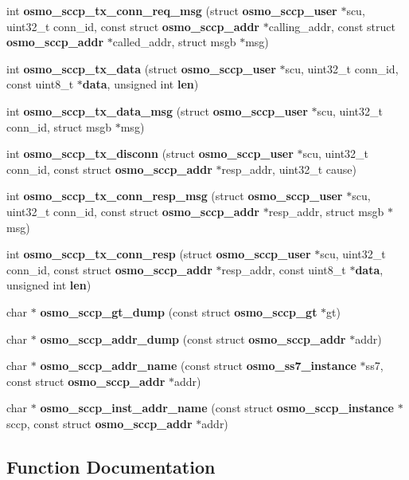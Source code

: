 \begin{DoxyCompactItemize}
int {\bf osmo\+\_\+sccp\+\_\+tx\+\_\+conn\+\_\+req\+\_\+msg} (struct {\bf osmo\+\_\+sccp\+\_\+user} $\ast$scu, uint32\+\_\+t conn\+\_\+id, const struct {\bf osmo\+\_\+sccp\+\_\+addr} $\ast$calling\+\_\+addr, const struct {\bf osmo\+\_\+sccp\+\_\+addr} $\ast$called\+\_\+addr, struct msgb $\ast$msg)
\item 
int {\bf osmo\+\_\+sccp\+\_\+tx\+\_\+data} (struct {\bf osmo\+\_\+sccp\+\_\+user} $\ast$scu, uint32\+\_\+t conn\+\_\+id, const uint8\+\_\+t $\ast${\bf data}, unsigned int {\bf len})
\item 
int {\bf osmo\+\_\+sccp\+\_\+tx\+\_\+data\+\_\+msg} (struct {\bf osmo\+\_\+sccp\+\_\+user} $\ast$scu, uint32\+\_\+t conn\+\_\+id, struct msgb $\ast$msg)
\item 
int {\bf osmo\+\_\+sccp\+\_\+tx\+\_\+disconn} (struct {\bf osmo\+\_\+sccp\+\_\+user} $\ast$scu, uint32\+\_\+t conn\+\_\+id, const struct {\bf osmo\+\_\+sccp\+\_\+addr} $\ast$resp\+\_\+addr, uint32\+\_\+t cause)
\item 
int {\bf osmo\+\_\+sccp\+\_\+tx\+\_\+conn\+\_\+resp\+\_\+msg} (struct {\bf osmo\+\_\+sccp\+\_\+user} $\ast$scu, uint32\+\_\+t conn\+\_\+id, const struct {\bf osmo\+\_\+sccp\+\_\+addr} $\ast$resp\+\_\+addr, struct msgb $\ast$msg)
\item 
int {\bf osmo\+\_\+sccp\+\_\+tx\+\_\+conn\+\_\+resp} (struct {\bf osmo\+\_\+sccp\+\_\+user} $\ast$scu, uint32\+\_\+t conn\+\_\+id, const struct {\bf osmo\+\_\+sccp\+\_\+addr} $\ast$resp\+\_\+addr, const uint8\+\_\+t $\ast${\bf data}, unsigned int {\bf len})
\item 
char $\ast$ {\bf osmo\+\_\+sccp\+\_\+gt\+\_\+dump} (const struct {\bf osmo\+\_\+sccp\+\_\+gt} $\ast$gt)
\item 
char $\ast$ {\bf osmo\+\_\+sccp\+\_\+addr\+\_\+dump} (const struct {\bf osmo\+\_\+sccp\+\_\+addr} $\ast$addr)
\item 
char $\ast$ {\bf osmo\+\_\+sccp\+\_\+addr\+\_\+name} (const struct {\bf osmo\+\_\+ss7\+\_\+instance} $\ast$ss7, const struct {\bf osmo\+\_\+sccp\+\_\+addr} $\ast$addr)
\item 
char $\ast$ {\bf osmo\+\_\+sccp\+\_\+inst\+\_\+addr\+\_\+name} (const struct {\bf osmo\+\_\+sccp\+\_\+instance} $\ast$sccp, const struct {\bf osmo\+\_\+sccp\+\_\+addr} $\ast$addr)
\end{DoxyCompactItemize}


\subsection{Function Documentation}
